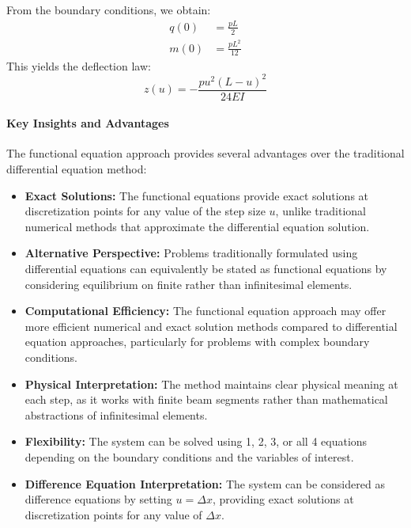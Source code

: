 From the boundary conditions, we obtain:
\begin{align}
q(0) &= \frac{pL}{2} \\
m(0) &= \frac{pL^2}{12}
\end{align}
This yields the deflection law:
\begin{equation}
z(u) = -\frac{pu^2(L-u)^2}{24EI}
\end{equation}

\paragraph{Key Insights and Advantages}
The functional equation approach provides several advantages over the traditional differential equation method:
\begin{itemize}
\item \textbf{Exact Solutions:} The functional equations provide exact solutions at discretization points for any value of the step size $u$, unlike traditional numerical methods that approximate the differential equation solution.

\item \textbf{Alternative Perspective:} Problems traditionally formulated using differential equations can equivalently be stated as functional equations by considering equilibrium on finite rather than infinitesimal elements.

\item \textbf{Computational Efficiency:} The functional equation approach may offer more efficient numerical and exact solution methods compared to differential equation approaches, particularly for problems with complex boundary conditions.

\item \textbf{Physical Interpretation:} The method maintains clear physical meaning at each step, as it works with finite beam segments rather than mathematical abstractions of infinitesimal elements.

\item \textbf{Flexibility:} The system can be solved using 1, 2, 3, or all 4 equations depending on the boundary conditions and the variables of interest.

\item \textbf{Difference Equation Interpretation:} The system can be considered as difference equations by setting $u = \Delta x$, providing exact solutions at discretization points for any value of $\Delta x$.
\end{itemize}

